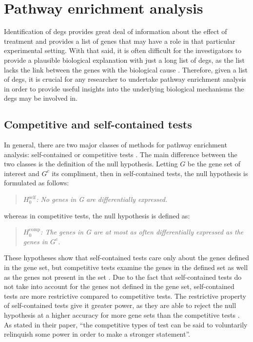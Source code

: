\section{Pathway enrichment analysis}
\label{sec:pathway_enrichment_analysis}

Identification of \glspl{deg} provides great deal of information about the effect of treatment and provides a list of genes that may have a role in that particular experimental setting.
With that said, it is often difficult for the investigators to provide a plausible biological explanation with just a long list of \glspl{deg}, as the list lacks the link between the genes with the biological cause \citep{Khatri2012}.
Therefore, given a list of \glspl{deg}, it is crucial for any researcher to undertake pathway enrichment analysis in order to provide useful insights into the underlying biological mechanisms the \glspl{deg} may be involved in.

\subsection{Competitive and self-contained tests}
\label{sub:competitive_and_self_contained_tests}

In general, there are two major classes of methods for pathway enrichment analysis: self-contained or competitive tests \citep{Goeman2007}.
The main difference between the two classes is the definition of the null hypothesis.
Letting $G$ be the gene set of interest and $G^c$ its compliment, then in self-contained tests, the null hypothesis is formulated as follows:
\begin{quote}
	\textit{$H_0^{\textrm{self}}$: No genes in G are differentially expressed. }
\end{quote}
whereas in competitive tests, the null hypothesis is defined as:
\begin{quote}
	\textit{$H_0^{\textrm{comp}}$: The genes in G are at most as often differentially expressed as the genes in $G^c$.
	}
\end{quote}
These hypotheses show that self-contained tests care only about the genes defined in the gene set, but competitive tests examine the genes in the defined set as well as the genes not present in the set \citep{Wu2012}.
Due to the fact that self-contained tests do not take into account for the genes not defined in the gene set, self-contained tests are more restrictive compared to competitive tests.
The restrictive property of self-contained tests give it greater power, as they are able to reject the null hypothesis at a higher accuracy for more gene sets than the competitive tests \citep{Goeman2007}.
As \citet{Goeman2007} stated in their paper, ``the competitive types of test can be said to voluntarily relinquish some power in order to make a stronger statement''.


